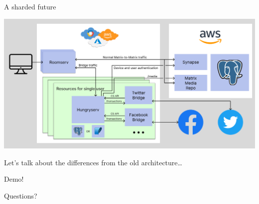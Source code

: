 \documentclass{beeper}
\begin{document}
\begin{frame}{A sharded future}
    \centerline{\includegraphics[width=1.15\textwidth]{images/new-architecture}}

    Let's talk about the differences from the old architecture\ldots
\end{frame}

\begingroup
\def\insertframenumber{\relax}
\begin{frame}[standout]
    \Large
    Demo!
\end{frame}

\begin{frame}[standout]
    \Large
    Questions?
\end{frame}
\endgroup
\end{document}
